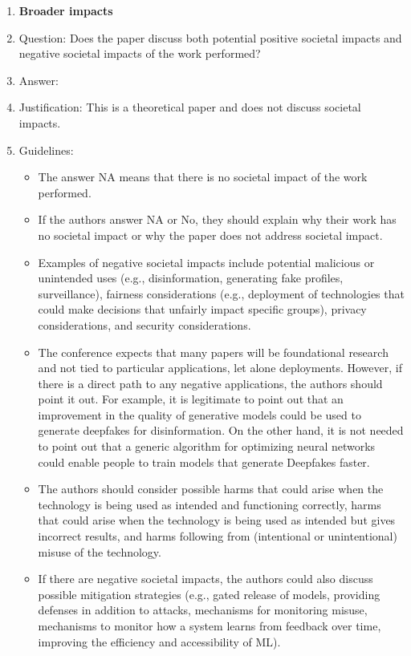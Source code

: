 \documentclass{article}
\begin{document}
\begin{enumerate}
\item {\bf Broader impacts}
    \item[] Question: Does the paper discuss both potential positive societal impacts and negative societal impacts of the work performed?
    \item[] Answer: \answerNA{} %
    \item[] Justification: This is a theoretical paper and does not discuss societal impacts.
    \item[] Guidelines:
    \begin{itemize}
        \item The answer NA means that there is no societal impact of the work performed.
        \item If the authors answer NA or No, they should explain why their work has no societal impact or why the paper does not address societal impact.
        \item Examples of negative societal impacts include potential malicious or unintended uses (e.g., disinformation, generating fake profiles, surveillance), fairness considerations (e.g., deployment of technologies that could make decisions that unfairly impact specific groups), privacy considerations, and security considerations.
        \item The conference expects that many papers will be foundational research and not tied to particular applications, let alone deployments. However, if there is a direct path to any negative applications, the authors should point it out. For example, it is legitimate to point out that an improvement in the quality of generative models could be used to generate deepfakes for disinformation. On the other hand, it is not needed to point out that a generic algorithm for optimizing neural networks could enable people to train models that generate Deepfakes faster.
        \item The authors should consider possible harms that could arise when the technology is being used as intended and functioning correctly, harms that could arise when the technology is being used as intended but gives incorrect results, and harms following from (intentional or unintentional) misuse of the technology.
        \item If there are negative societal impacts, the authors could also discuss possible mitigation strategies (e.g., gated release of models, providing defenses in addition to attacks, mechanisms for monitoring misuse, mechanisms to monitor how a system learns from feedback over time, improving the efficiency and accessibility of ML).
    \end{itemize}
    

\end{enumerate}
\end{document}
